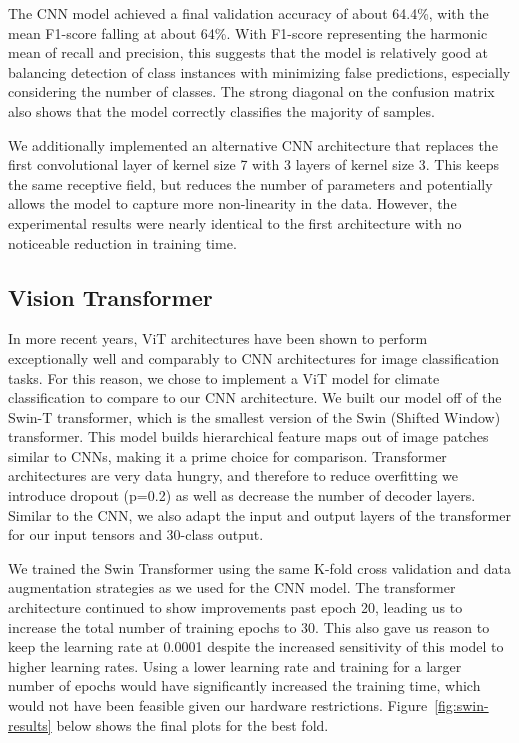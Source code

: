 \documentclass[12pt]{article}
\begin{document}
The CNN model achieved a final validation accuracy of about 64.4\%, with the mean F1-score falling at about 64\%.
With F1-score representing the harmonic mean of recall and precision, this suggests that the model is relatively good at balancing detection of class instances with minimizing false predictions, especially considering the number of classes.
The strong diagonal on the confusion matrix also shows that the model correctly classifies the majority of samples.

We additionally implemented an alternative CNN architecture that replaces the first convolutional layer of kernel size 7 with 3 layers of kernel size 3.
This keeps the same receptive field, but reduces the number of parameters and potentially allows the model to capture more non-linearity in the data.
However, the experimental results were nearly identical to the first architecture with no noticeable reduction in training time.

\subsection{Vision Transformer}
\label{subsec:vit-architecture}
In more recent years, ViT architectures have been shown to perform exceptionally well and comparably to CNN architectures for image classification tasks.
For this reason, we chose to implement a ViT model for climate classification to compare to our CNN architecture.
We built our model off of the Swin-T transformer, which is the smallest version of the Swin (Shifted Window) transformer.
This model builds hierarchical feature maps out of image patches similar to CNNs, making it a prime choice for comparison.
Transformer architectures are very data hungry, and therefore to reduce overfitting we introduce dropout (p=0.2) as well as decrease the number of decoder layers.
Similar to the CNN, we also adapt the input and output layers of the transformer for our input tensors and 30-class output.

We trained the Swin Transformer using the same K-fold cross validation and data augmentation strategies as we used for the CNN model.
The transformer architecture continued to show improvements past epoch 20, leading us to increase the total number of training epochs to 30.
This also gave us reason to keep the learning rate at 0.0001 despite the increased sensitivity of this model to higher learning rates.
Using a lower learning rate and training for a larger number of epochs would have significantly increased the training time, which would not have been feasible given our hardware restrictions.
Figure~\ref{fig:swin-results} below shows the final plots for the best fold.
\end{document}
